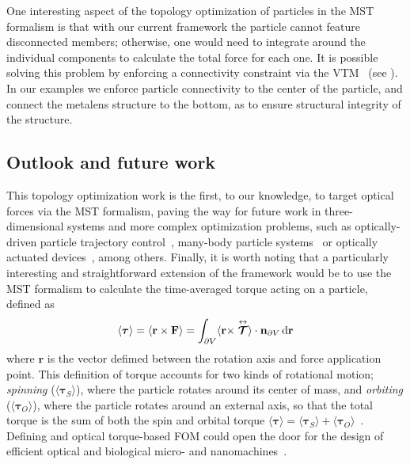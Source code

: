 One interesting aspect of the topology optimization of particles in the MST formalism is that with our current framework the particle cannot feature disconnected members; otherwise,
one would need to integrate around the individual components to calculate the total force for each one. It is possible solving this problem by enforcing 
a connectivity constraint via the VTM~\cite{li_structural_2016} (see ). In our examples
we enforce particle connectivity to the center of the particle, and connect the metalens structure to the bottom, as to ensure structural
integrity of the structure.

\subsection*{Outlook and future work}

This topology optimization work is the first, to our knowledge, to 
target optical forces via the MST formalism, paving the way for future work in three-dimensional systems and more complex optimization problems, such as optically-driven particle
trajectory control~\cite{zemanek_perspective_2019, macdonald_microfluidic_2003, shilkin_directional_2017}, many-body particle systems~\cite{bechinger_active_2016, chang_colloquium_2018} or optically actuated devices~\cite{ivanyi_optically_2024}, among others.
Finally, it is worth noting that a particularly interesting and straightforward extension of the framework would be to use the MST formalism to calculate the time-averaged torque acting on a particle, defined as~\cite{novotny}
\begin{equation}\label{eq:torque}
    \langle \bm{\tau} \rangle = \langle \mathbf{r} \times \mathbf{F} \rangle = \int_{\partial V} \langle \mathbf{r}
     \times \stackrel{\leftrightarrow}{\bm{\mathcal{T}}} \rangle \cdot \mathbf{n}_{\partial V} \mathop{}\!\text{d}\mathbf{r} 
\end{equation}
where $\mathbf{r}$ is the vector defimed between the rotation axis and force application point. This definition of torque accounts
for two kinds of rotational motion; \textit{spinning} ($\langle \bm{\tau}_S \rangle$), where the particle rotates around its center of mass,
and \textit{orbiting} ($\langle \bm{\tau}_O \rangle$), where the particle rotates around an external axis, so that the total torque is the sum
of both the spin and orbital torque $\langle \bm{\tau} \rangle = \langle \bm{\tau}_S \rangle + \langle \bm{\tau}_O \rangle$~\cite{torque}.  Defining
and optical torque-based FOM could open the door for the design of efficient optical and biological micro- and nanomachines~\cite{rotating, gluck}.

